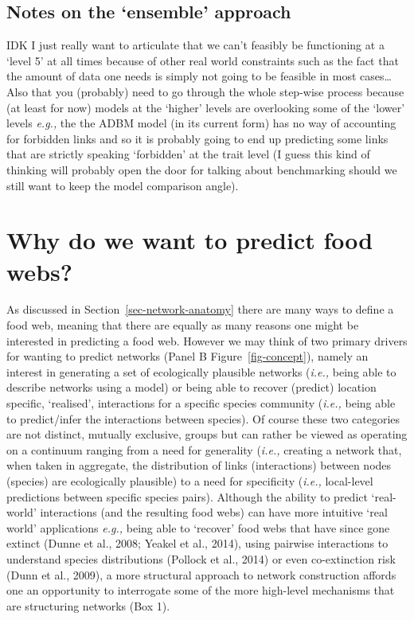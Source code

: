 \documentclass[
]{article}
\begin{document}
\begin{tcolorbox}
\subsection*{Notes on the `ensemble'
approach}\label{notes-on-the-ensemble-approach}

IDK I just really want to articulate that we can't feasibly be
functioning at a `level 5' at all times because of other real world
constraints such as the fact that the amount of data one needs is simply
not going to be feasible in most cases\ldots{} Also that you (probably)
need to go through the whole step-wise process because (at least for
now) models at the `higher' levels are overlooking some of the `lower'
levels \emph{e.g.,} the the ADBM model (in its current form) has no way
of accounting for forbidden links and so it is probably going to end up
predicting some links that are strictly speaking `forbidden' at the
trait level (I guess this kind of thinking will probably open the door
for talking about benchmarking should we still want to keep the model
comparison angle).

\end{tcolorbox}

\section{Why do we want to predict food webs?}\label{sec-network-why}

As discussed in Section~\ref{sec-network-anatomy} there are many ways to
define a food web, meaning that there are equally as many reasons one
might be interested in predicting a food web. However we may think of
two primary drivers for wanting to predict networks (Panel B
Figure~\ref{fig-concept}), namely an interest in generating a set of
ecologically plausible networks (\emph{i.e.,} being able to describe
networks using a model) or being able to recover (predict) location
specific, `realised', interactions for a specific species community
(\emph{i.e.,} being able to predict/infer the interactions between
species). Of course these two categories are not distinct, mutually
exclusive, groups but can rather be viewed as operating on a continuum
ranging from a need for generality (\emph{i.e.,} creating a network
that, when taken in aggregate, the distribution of links (interactions)
between nodes (species) are ecologically plausible) to a need for
specificity (\emph{i.e.,} local-level predictions between specific
species pairs). Although the ability to predict `real-world'
interactions (and the resulting food webs) can have more intuitive `real
world' applications \emph{e.g.,} being able to `recover' food webs that
have since gone extinct (Dunne et al., 2008; Yeakel et al., 2014), using
pairwise interactions to understand species distributions (Pollock et
al., 2014) or even co-extinction risk (Dunn et al., 2009), a more
structural approach to network construction affords one an opportunity
to interrogate some of the more high-level mechanisms that are
structuring networks (Box 1).
\end{document}
